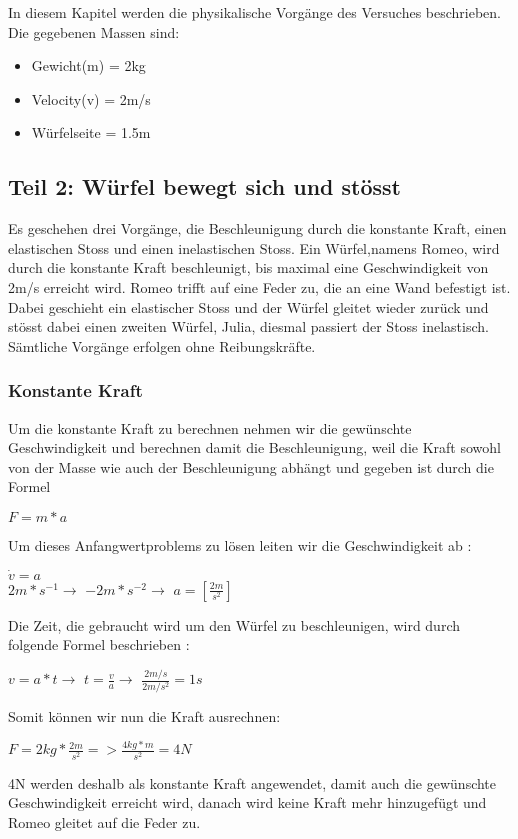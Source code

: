 \documentclass[../main.tex]{subfiles}
\begin{document}
In diesem Kapitel werden die physikalische Vorgänge des Versuches beschrieben. 
Die gegebenen Massen sind:
\begin{itemize}
	\item Gewicht(m) = 2kg
	\item Velocity(v) = 2m/s
	\item Würfelseite = 1.5m
\end{itemize}
\subsection{Teil 2: Würfel bewegt sich und stösst}
Es geschehen drei Vorgänge, die Beschleunigung durch die konstante Kraft, einen elastischen Stoss und einen inelastischen Stoss.
Ein Würfel,namens Romeo, wird durch die konstante Kraft beschleunigt, bis maximal eine Geschwindigkeit von 2m/s erreicht wird. Romeo trifft auf eine Feder zu, die an eine Wand befestigt ist. Dabei geschieht ein elastischer Stoss und der Würfel gleitet wieder zurück und stösst dabei einen zweiten Würfel, Julia, diesmal passiert der Stoss inelastisch. Sämtliche Vorgänge erfolgen ohne Reibungskräfte.
\subsubsection{Konstante Kraft}
Um die konstante Kraft zu berechnen nehmen wir die gewünschte Geschwindigkeit und berechnen damit die Beschleunigung, weil die Kraft sowohl von der Masse wie auch der Beschleunigung abhängt und gegeben ist durch die Formel\cite{tiplerpaula.PhysikFurStudierende}
\begin{mdframed}
		 $F = m*a$
\end{mdframed}
Um dieses Anfangwertproblems zu lösen leiten wir die Geschwindigkeit ab \cite{tiplerpaula.PhysikFurStudierende}:
\begin{mdframed}
		 $\dot{v} = a$\\
$2m*s^{-1} \rightarrow$  $-2m*s^{-2} \rightarrow$  $a = [\frac{2m}{s^{2}}]$
\end{mdframed}
Die Zeit, die gebraucht wird um den Würfel zu beschleunigen, wird durch folgende Formel beschrieben \cite{tiplerpaula.PhysikFurStudierende}:
\begin{mdframed}
 $v=a*t \rightarrow$ $t=\frac{v}{a} \rightarrow$ $\frac{2m/s}{2m/s^{2}} = 1s$
\end{mdframed}
Somit können wir nun die Kraft ausrechnen:
\begin{mdframed}
$F = 2kg * \frac{2m}{s^{2}} => \frac{4kg*m}{s^{2}} = 4N$
\end{mdframed}
4N werden deshalb als konstante Kraft angewendet, damit auch die gewünschte Geschwindigkeit erreicht wird, danach wird keine Kraft mehr hinzugefügt und Romeo gleitet auf die Feder zu.
\newpage
\end{document}
